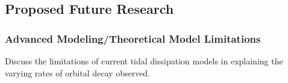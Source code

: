 \documentclass[oneside,12pt]{amsart}
\numberwithin{page}{section}
\begin{document}


\clearpage


\subsection{Proposed Future Research}

\subsubsection{Advanced Modeling/Theoretical Model Limitations}
Discuss the limitations of current tidal dissipation models in explaining the varying rates of orbital decay observed.
\end{document}
